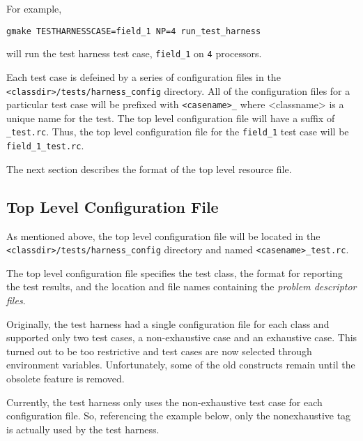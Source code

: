 For example,
\begin{verbatim}
gmake TESTHARNESSCASE=field_1 NP=4 run_test_harness
\end{verbatim}
will run the test harness test case, \texttt{field\_1} on \texttt{4} processors.

Each test case is defeined by a series of configuration files in the
\texttt{<classdir>/tests/harness\_config} directory.  
All of the configuration files for a particular test case will be prefixed with 
\texttt{<casename>\_} where <classname> is a unique name for the test. 
The top level configuration file will have a suffix of \texttt{\_test.rc}.
Thus, the top level configuration file for the \texttt{field\_1} test case will be
\texttt{field\_1\_test.rc}.

The next section describes the format of the top level resource file.

\subsection{Top Level Configuration File}
\label{sec:harness_toplevelfile}
As mentioned above, the top level configuration file will be located in the 
\texttt{<classdir>/tests/harness\_config} directory and named \texttt{<casename>\_test.rc}.
 
The top level configuration file specifies the test class, the 
format for reporting the test results, and the location and file names containing 
the \textit{problem descriptor files}. 

Originally, the test harness had a single configuration file for each class and 
supported only two test cases, a non-exhaustive case and an exhaustive case.
This turned out to be too restrictive and test cases are now selected through environment variables.
Unfortunately, some of the old constructs remain until the obsolete feature is removed.

Currently, the test harness only uses the non-exhaustive test case for each configuration file.
So, referencing the example below, only the nonexhaustive tag is actually used by the test harness. 

